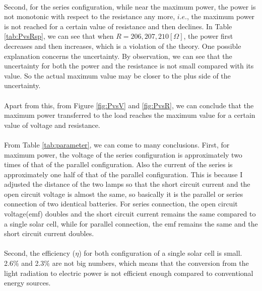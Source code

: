 \documentclass[a4paper]{article}
\begin{document}
    \paragraph{} Second, for the series configuration, while near the maximum power, the power is not monotonic with respect to the resistance any more, $i.e.$, the maximum power is not reached for a certain value of resistance and then declines. In Table \ref{tab:PvsRsp}, we can see that when $R=206, 207, 210[\Omega]$, the power first decreases and then increases, which is a violation of the theory. One possible explanation concerns the uncertainty. By observation, we can see that the uncertainty for both the power and the resistance is not small compared with its value. So the actual maximum value may be closer to the plus side of the uncertainty. 
    \vspace{-5mm}
    \paragraph{} Apart from this, from Figure \ref{fig:PvsV} and \ref{fig:PvsR}, we can conclude that the maximum power transferred to the load reaches the maximum value for a certain value of voltage and resistance. 
    \vspace{-5mm}
    \paragraph{} From Table \ref{tab:parameter}, we can come to many conclusions. First, for maximum power, the voltage of the series configuration is approximately two times of that of the parallel configuration. Also the current of the series is approximately one half of that of the parallel configuration. This is because I adjusted the distance of the two lamps so that the short circuit current and the open circuit voltage is almost the same, so basically it is the parallel or series connection of two identical batteries. For series connection, the open circuit voltage(emf) doubles and the short circuit current remains the same compared to a single solar cell, while for parallel connection, the emf remains the same and the short circuit current doubles. 
    \vspace{-5mm}
    \paragraph{} Second, the efficiency ($\eta$) for both configuration of a single solar cell is small. 2.6\% and 2.3\% are not big numbers, which means that the conversion from the light radiation to electric power is not efficient enough compared to conventional energy sources. 
\end{document}
